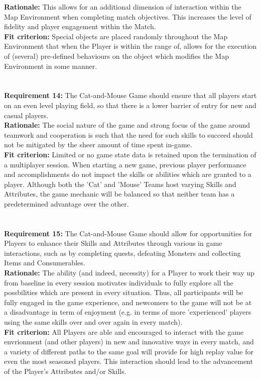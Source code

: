\documentclass[12pt, titlepage]{article}
\begin{document}
\textbf{Rationale:} This allows for an additional dimension of interaction within the Map Environment when completing match objectives. This increases the level of fidelity and player engagement within the Match. \\
\textbf{Fit criterion:}  Special objects are placed randomly throughout the Map Environment that when the Player is within the range of, allows for the execution of (several) pre-defined behaviours on the object which modifies the Map Environment in some manner. 
\\
\\
\\ \textbf{Requirement 14:}  The Cat-and-Mouse Game should ensure that all players start on an even level playing field, so that there is a lower barrier of entry for new and casual players.\\
\textbf{Rationale:}  The social nature of the game and strong focus of the game around teamwork and cooperation is such that the need for such skills to succeed should not be mitigated by the sheer amount of time spent in-game.\\
\textbf{Fit criterion:}  Limited or no game state data is retained upon the termination of a multiplayer session. When starting a new game, previous player performance and accomplishments do not impact the skills or abilities which are granted to a player. Although both the 'Cat' and 'Mouse' Teams host varying Skills and Attributes, the game mechanic will be balanced so that neither team has a predetermined advantage over the other.
\\
\\
\\\textbf{Requirement 15:}  The Cat-and-Mouse Game should allow for opportunities for Players to enhance their Skills and Attributes through various in game interactions, such as by completing quests, defeating Monsters and collecting Items and Consumerables.   \\
\textbf{Rationale:}  The ability (and indeed, necessity) for a Player to work their way up from baseline in every session motivates individuals to fully explore all the possbilities which are present in every situation. Thus, all participants will be fully engaged in the game experience, and newcomers to the game will not be at a disadvantage in term of enjoyment (e.g. in terms of more 'experienced' players using the same skills over and over again in every match).\\
\textbf{Fit criterion:}  All Players are able and encouraged to interact with the game envrionment (and other players) in new and innovative ways in every match, and a variety of different paths to the same goal will provide for high replay value for even the most seasoned players. This interaction should lead to the advancement of the Player's Attributes and/or Skills.
\end{document}
